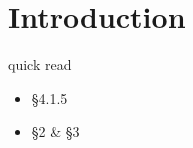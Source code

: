 \section{Introduction}


quick read


\begin{itemize}
  \item \S 4.1.5
  \item \S 2 \& \S 3
\end{itemize}

\begin{CJK*}{UTF8}{gbsn}


\end{CJK*}


\begin{comment}


\section{mini outline}

 
 

Expected Contribution:
1. A novel and more precise model for software rejuvenation.  Compared to the original model, the new model
    a. fixes the problem of using mean transition rate between states.
    b. adds the notion of S(t).  Instead of randomly jump to a healthy state (the original model), S(t) will evolve to either S(t+s) or R(0).
    c. merges the highly robust state (the unrealistic state where failure will not occur) and the a failure
probable state (where failures are likely to occur) to W(t), where the failure rate is a function about t.
    d.  split the transaction from the failure state to the highly robust state (i.e. W(0)) to two steps:  W(t) -> S(0) (data restore etc.) and S(t) -> R(0) (cleaning cache etc.). 

2. The approach of availability analysis can be generalized to analyze of the execution cost.
3. An efficient algorithm for approximate estimation on availability and other cost.


The research scope:

The first phrase of this research only aims at modelling a single component or a software system as a whole.  If time permits, we may extend the work to clusters, the widest scope I found in papers on software rejuvenation.

\end{comment}

